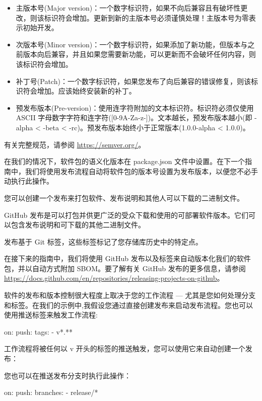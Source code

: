 \begin{itemize}
\item 
主版本号(Major version)：一个数字标识符，如果不向后兼容且有破坏性更改，则该标识符会增加。更新到新的主版本号必须谨慎处理！主版本号为零表示初始开发。

\item 
次版本号(Minor version)：一个数字标识符，如果添加了新功能，但版本与之前版本向后兼容，并且如果您需要新功能，可以更新而不会破坏任何内容，则该标识符会增加。

\item 
补丁号(Patch)：一个数字标识符，如果您发布了向后兼容的错误修复，则该标识符会增加。应该始终安装新的补丁。

\item 
预发布版本(Pre-version)：使用连字符附加的文本标识符。标识符必须仅使用 ASCII 字母数字字符和连字符([0-9A-Za-z-])。文本越长，预发布版本越小(即 -alpha < -beta < -rc)。预发布版本始终小于正常版本(1.0.0-alpha < 1.0.0)。
\end{itemize}

有关完整规范，请参阅 \url{https://semver.org/}。

在我们的情况下，软件包的语义化版本在 package.json 文件中设置。在下一个指南中，我们将使用发布流程自动将软件包的版本号设置为发布版本，以便您不必手动执行此操作。


您可以创建一个发布来打包软件、发布说明和其他人可以下载的二进制文件。

GitHub 发布是可以打包并供更广泛的受众下载和使用的可部署软件版本。它们可以包含发布说明和可下载的其他二进制文件。

发布基于 Git 标签，这些标签标记了您存储库历史中的特定点。

在接下来的指南中，我们将使用 GitHub 发布以及标签来自动版本化我们的软件包，并以自动方式附加 SBOM。要了解有关 GitHub 发布的更多信息，请参阅 \url{https://docs.github.com/en/repositories/releasing-projects-on-github}。


软件的发布和版本控制很大程度上取决于您的工作流程 --- 尤其是您如何处理分支和标签。在我们的示例中,我假设您通过直接创建发布来启动发布流程。您也可以使用推送标签来触发工作流程:

\begin{shell}
on:
  push:
    tags:
      - v*.**
\end{shell}

工作流程将被任何以 v 开头的标签的推送触发，您可以使用它来自动创建一个发布：


您也可以在推送发布分支时执行此操作：

\begin{shell}
on:
  push:
    branches:
      - release/*
\end{shell}






